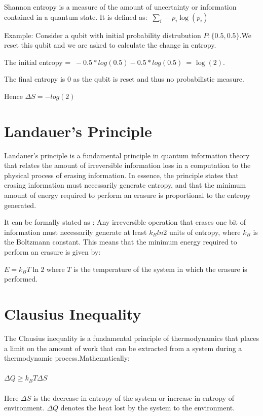 \documentclass{article}
\begin{document}
Shannon entropy is a measure of the amount of uncertainty or information contained in a quantum state. It is defined as:
$\ \sum_{i} -p_i \log(p_i)$

Example:
Consider a qubit with initial probability distrubution $P:\{0.5,0.5\}$.We reset this qubit and we are asked to calculate the change in entropy.

The initial entropy = $\ -0.5*log(0.5) - 0.5*log(0.5)$\ = $\log(2)$.

The final entropy is 0 as the qubit is reset and thus no probabilistic measure.

Hence $\Delta S = -log(2)$

\section{Landauer's Principle}

Landauer's principle is a fundamental principle in quantum information theory that relates the amount of irreversible information loss in a computation to the physical process of erasing information. In essence, the principle states that erasing information must necessarily generate entropy, and that the minimum amount of energy required to perform an erasure is proportional to the entropy generated.

It can be formally stated as : Any irreversible operation that erases one bit of information must necessarily generate at least $k_B ln 2$ units of entropy, where $k_B$ is the Boltzmann constant. This means that the minimum energy required to perform an erasure is given by:

$E = k_B T \ln 2$ where $T$ is the temperature of the system in which the erasure is performed.

\section{Clausius Inequality}

The Clausius inequality is a fundamental principle of thermodynamics that places a limit on the amount of work that can be extracted from a system during a thermodynamic process.Mathematically: \\\\
$\Delta Q \geq k_B T \Delta S$ \\\\
Here $\Delta S$ is the decrease in entropy of the system or increase in entropy of environment. $\Delta Q$ denotes the heat lost by the system to the environment.
\end{document}
